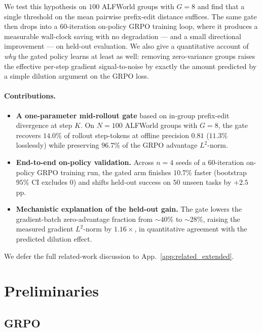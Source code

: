 \documentclass{article}
\begin{document}
We test this hypothesis on $100$ ALFWorld groups with $G\!=\!8$
and find that a single threshold on the mean pairwise prefix-edit
distance suffices. The same gate then drops into a $60$-iteration
on-policy GRPO training loop, where it produces a measurable
wall-clock saving with no degradation --- and a small directional
improvement --- on held-out evaluation. We also give a
quantitative account of \emph{why} the gated policy learns at
least as well: removing zero-variance groups raises the effective
per-step gradient signal-to-noise by exactly the amount predicted
by a simple dilution argument on the GRPO loss.

\paragraph{Contributions.}
\begin{itemize}[leftmargin=*,topsep=0pt,itemsep=2pt]
\item \textbf{A one-parameter mid-rollout gate} based on in-group
prefix-edit divergence at step $K$. On $N\!=\!100$ ALFWorld
groups with $G\!=\!8$, the gate recovers $\mathbf{14.0\%}$ of
rollout step-tokens at offline precision $0.81$ ($\mathbf{11.3\%}$
losslessly) while preserving $\mathbf{96.7\%}$ of the GRPO
advantage $L^2$-norm.
\item \textbf{End-to-end on-policy validation.} Across $n\!=\!4$
seeds of a $60$-iteration on-policy GRPO training run, the gated
arm finishes $\mathbf{10.7\%}$ faster (bootstrap $95\%$ CI
excludes $0$) and shifts held-out success on $50$ unseen tasks
by $\mathbf{+2.5}$ pp.
\item \textbf{Mechanistic explanation of the held-out gain.}
The gate lowers the gradient-batch zero-advantage fraction from
$\sim\!40\%$ to $\sim\!28\%$, raising the measured gradient
$L^2$-norm by $\mathbf{1.16\!\times}$, in quantitative agreement
with the predicted dilution effect.
\end{itemize}

We defer the full related-work discussion to
App.~\ref{app:related_extended}.


\section{Preliminaries}
\label{sec:prelim}

\subsection{GRPO}
\label{sec:prelim_grpo}
\end{document}

